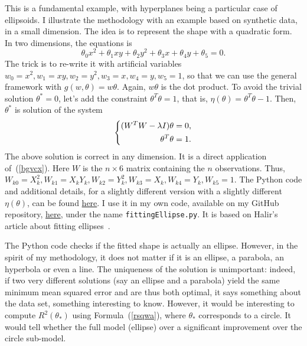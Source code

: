 \documentclass[oneside,10pt]{book}
\begin{document}
This is a fundamental example, with hyperplanes being a particular case of ellipsoids. I illustrate the methodology with an example based on synthetic data, in a small dimension. The idea is to represent the shape with a quadratic form. In two dimensions, the equations is
$$
\theta_0 x^2 + \theta_1 xy + \theta_2 y^2 + \theta_3 x + \theta_4 y + \theta_5=0.
$$
The trick is to re-write it with artificial variables $w_0=x^2, w_1=xy,w_2=y^2, w_3=x,w_4=y,w_5=1$, so that we can use the general framework
 with $g(w,\theta)=w\theta$. Again, $w\theta$ is the dot product. To avoid the trivial solution $\theta^*=0$, let's add the constraint
 $\theta^T\theta=1$, that is, $\eta(\theta)=\theta^T\theta-1$. Then, $\theta^*$ is solution of  the system
\begin{equation}
\centering
\left\{\begin{split}
( W^TW -\lambda I)\theta & =0, \\
 \theta^T\theta & =1. \\
\end{split}\right. \label{bgvcx2} %
\end{equation}
The above solution is correct in any dimension. It is a direct application of~(\ref{bgvcx}). Here $W$ is the $n \times 6$ matrix containing the $n$ observations. Thus, $W_{k0}=X_k^2, W_{k1}=X_kY_k, W_{k2}=Y_k^2,  W_{k3}=X_k, W_{k4}=Y_k, W_{k5}=1$. The Python code and additional details, for a slightly different version with a slightly different $\eta(\theta)$, can be found \href{https://scipython.com/blog/direct-linear-least-squares-fitting-of-an-ellipse/}{here}. I use it in my own code, available on my GitHub repository, \href{https://github.com/VincentGranville/Machine-Learning/blob/main/Source\%20Code/fittingEllipse.py}{here}, under the name \texttt{fittingEllipse.py}.  It is based on Halir's article about fitting ellipses~\cite{Halir98numericallystable}.

The Python code checks if the fitted shape is actually an ellipse. However, in the spirit of my methodology, it does not matter if it is an ellipse, a parabola, an hyperbola or even a line. The uniqueness of the solution is unimportant: indeed, if two very different solutions (say an ellipse and a
 parabola) yield the same minimum mean squared error and are thus both optimal, it says something about the data set,
 something interesting to know.   However, it would be interesting to compute $R^2(\theta_*)$ using
 Formula~(\ref{rsqwa}), where $\theta_*$ corresponds to a circle. It would tell
 whether the full model (ellipse) over a significant improvement over the circle sub-model.
\end{document}
